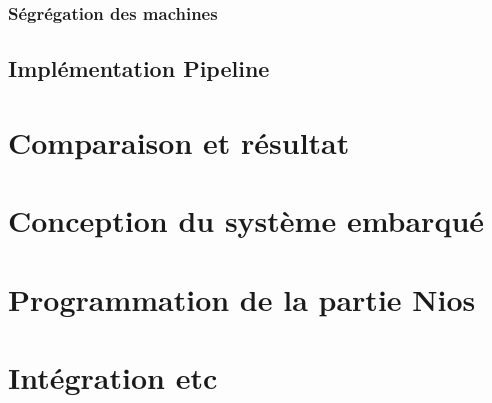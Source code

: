 \documentclass[12pt,a4paper]{article}
\begin{document}
\subsubsection{Ségrégation des machines} %

\subsection{Implémentation Pipeline} %

\section{Comparaison et résultat}

\section{Conception du système embarqué} %
\section{Programmation de la partie Nios}
\section{Intégration etc } %
	
\end{document}

